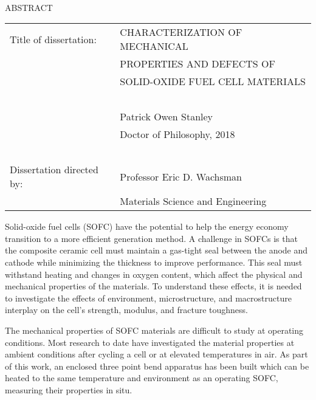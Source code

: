 

\hbox{\ }

\renewcommand{\baselinestretch}{1}
\small \normalsize

\begin{center}
\large{{ABSTRACT}}

\vspace{3em}

\end{center}
\hspace{-.15in}
\begin{tabular}{ll}
Title of dissertation:    & {\large  CHARACTERIZATION OF MECHANICAL}\\
&				      {\large  PROPERTIES AND DEFECTS OF  } \\
&				      {\large  SOLID-OXIDE FUEL CELL MATERIALS } \\
\ \\
&                          {\large  Patrick Owen Stanley} \\
&                           {\large Doctor of Philosophy, 2018}\\
\ \\
Dissertation directed by: & {\large  Professor Eric D. Wachsman} \\
&  				{\large	 Materials Science and Engineering } \\
\end{tabular}

\vspace{3em}

\renewcommand{\baselinestretch}{2}
\large \normalsize


Solid-oxide fuel cells (SOFC) have the potential to help the energy economy transition to a more efficient generation method.
A challenge in SOFCs is that the composite ceramic cell must maintain a gas-tight seal between the anode and cathode while minimizing the thickness to improve performance.
This seal must withstand heating and changes in oxygen content, which affect the physical and mechanical properties of the materials.
To understand these effects, it is needed to investigate the effects of environment, microstructure, and macrostructure interplay on the cell’s strength, modulus, and fracture toughness.

The mechanical properties of SOFC materials are difficult to study at operating conditions.
Most research to date have investigated the material properties at ambient conditions after cycling a cell or at elevated temperatures in air.
As part of this work, an enclosed three point bend apparatus has been built which can be heated to the same temperature and environment as an operating SOFC, measuring their properties in situ.

